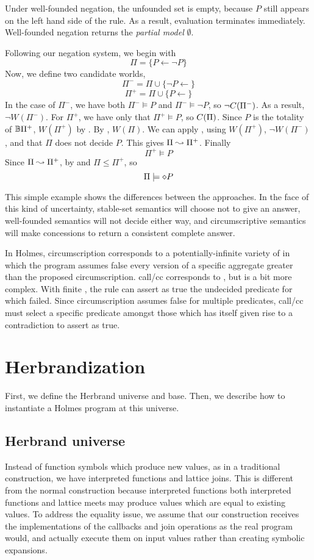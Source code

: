 Under well-founded negation, the unfounded set is empty, because $P$ still appears on the left hand side of the rule.
As a result, evaluation terminates immediately.
Well-founded negation returns the \emph{partial model} $\emptyset$.

Following our negation system, we begin with
\[\Pi = \{P \leftarrow \neg P\}\]
Now, we define two candidate worlds,
\[\Pi^- = \Pi \cup \{\neg P \leftarrow\}\]
\[\Pi^+ = \Pi \cup \{P \leftarrow\}\]
In the case of $\Pi^-$, we have both $\Pi^- \models P$ and $\Pi^- \models \neg P$, so $\neg C(\Pi^-)$.
As a result, $\neg W(\Pi^-)$.
For $\Pi^+$, we have only that $\Pi^+ \models P$, so $C(\Pi)$.
Since $P$ is the totality of $\mathbb{B}{\Pi^+}$, $W(\Pi^+)$ by .
By , $W(\Pi)$.
We can apply , using $W(\Pi^+)$, $\neg W(\Pi^-)$, and that $\Pi$ does not decide $P$.
This gives $\Pi \leadsto \Pi^+$.
Finally
\[
	\Pi^+ \models P
\]
Since $\Pi \leadsto \Pi^+$, by  and  $\Pi \leq \Pi^+$, so
\[
	\Pi \models \diamond P
\]

This simple example shows the differences between the approaches.
In the face of this kind of uncertainty, stable-set semantics will choose not to give an answer, well-founded semantics will not decide either way, and circumscriptive semantics will make concessions to return a consistent complete answer. 

In Holmes, circumscription corresponds to a potentially-infinite variety of  in which the program assumes false every version of a specific aggregate greater than the proposed circumscription.
call/cc corresponds to , but is a bit more complex.
With finite , the  rule can assert as true the undecided predicate for which  failed.
Since circumscription assumes false for multiple predicates, call/cc must select a specific predicate amongst those which has itself given rise to a contradiction to assert as true.

\section{Herbrandization}
\label{formal:sec:herbrand}
First, we define the Herbrand universe and base.
Then, we describe how to instantiate a Holmes program at this universe.

\subsection{Herbrand universe}
\label{formal:sec:callbacks}
Instead of function symbols which produce new values, as in a traditional construction, we have interpreted functions and lattice joins.
This is different from the normal construction because interpreted functions both interpreted functions and lattice meets may produce values which are equal to existing values.
To address the equality issue, we assume that our construction receives the implementations of the callbacks and join operations as the real program would, and actually execute them on input values rather than creating symbolic expansions.

